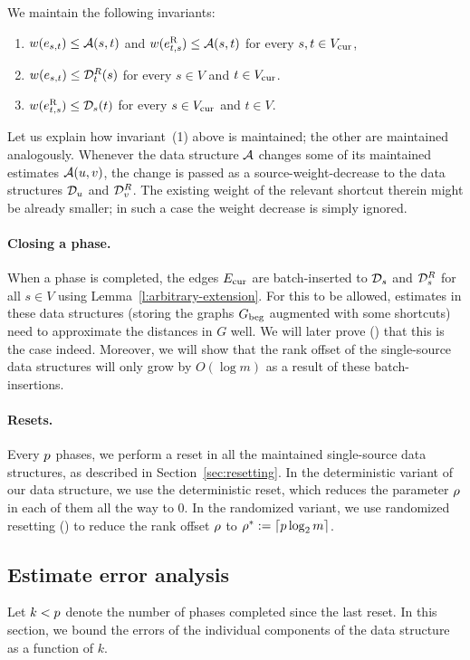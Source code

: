 \documentclass[11pt,letterpaper]{article}
\theoremstyle{plain}
\renewcommand{\O}{O}
\newcommand{\wei}{w}
\newcommand{\rev}[1]{#1^{\textrm{R}}}
\begin{document}
We maintain the following invariants:
\begin{enumerate}[label=(\arabic*)]
\item $\wei(e_{s,t})\leq \apsp(s,t)$ and $\wei(\rev{e_{t,s}})\leq \apsp(s,t)$ for every $s,t\in V_{\mathrm{cur}}$,
\item $\wei(e_{s,t})\leq \dsto_t(s)$ for every $s\in V$ and $t\in V_{\mathrm{cur}}$.
\item $\wei(\rev{e_{t,s}})\leq \dsfrom_s(t)$ for every $s\in V_{\mathrm{cur}}$ and $t\in V$.
\end{enumerate}
Let us explain how invariant~(1) above is maintained; the other are maintained analogously.
Whenever the data structure $\mathcal{A}$ changes some of its maintained estimates $\mathcal{A}(u,v)$, the change is passed
as a source-weight-decrease to the data structures $\mathcal{D}_u$ and $\mathcal{D}^{R}_v$.
The existing weight of the relevant shortcut therein might be already smaller; in such a case
the weight decrease is simply ignored.
\paragraph{Closing a phase.}
When a phase is completed, the edges $E_{\mathrm{cur}}$ are batch-inserted to $\mathcal{D}_s$ and $\mathcal{D}^{R}_s$
for all $s\in V$ using Lemma~\ref{l:arbitrary-extension}. For this to be allowed, 
estimates in these data structures (storing the graphs $G_{\mathrm{beg}}$ augmented with some shortcuts) need to approximate the distances
in $G$ well.
We will later prove () that this is the case indeed.
Moreover, we will show that the rank offset of the single-source data structures
will only grow by $\O(\log{m})$ as a result of these batch-insertions.

\paragraph{Resets.} Every $p$ phases, we perform a reset in all the maintained single-source
data structures, as described in Section~\ref{sec:resetting}.
In the deterministic variant of our data structure, we use the deterministic reset,
which reduces the parameter $\rho$ in each of them all the way to $0$.
In the randomized variant, we use randomized resetting () to reduce the rank offset $\rho$ to
$\rho^*:=\lceil p\log_2{m}\rceil$.

\subsection{Estimate error analysis}
Let $k< p$ denote the number of phases completed since the last reset. 
In this section, we
bound the errors of the individual components of the data structure
as a function of $k$.
\end{document}
